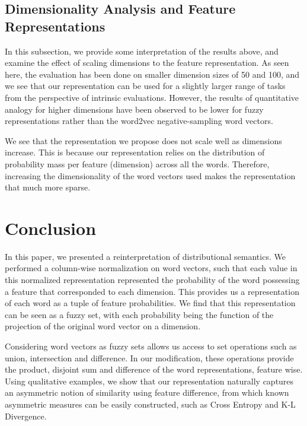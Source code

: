 \documentclass[11pt]{book}
\begin{document}
\subsection{Dimensionality Analysis and Feature Representations} \label{ssec:
analysis}

In this subsection, we provide some interpretation of the results above, and
examine the effect of scaling dimensions to the feature representation. As seen
here, the evaluation has been done on smaller dimension sizes of 50 and 100,
and we see that our representation can be used for a slightly larger range of
tasks from the perspective of intrinsic evaluations. However, the results of
quantitative analogy for higher dimensions have been observed to be lower for
fuzzy representations rather than the word2vec negative-sampling word vectors. 

We see that the representation we propose does not scale well as dimensions
increase. This is because our representation relies on the distribution of
probability mass per feature (dimension) across all the words. Therefore,
increasing the dimensionality of the word vectors used makes the representation
that much more sparse.

\section{Conclusion} \label{sec: conclusion}

In this paper, we presented a reinterpretation of distributional semantics. We
performed a column-wise normalization on word vectors, such that each value in
this normalized representation represented the probability of the word
possessing a feature that corresponded to each dimension. This provides us a
representation of each word as a tuple of feature probabilities. We find that
this representation can be seen as a fuzzy set, with each probability being the
function of the projection of the original word vector on a dimension.

Considering word vectors as fuzzy sets allows us access to set operations such
as union, intersection and difference. In our modification, these operations
provide the product, disjoint sum and difference of the word representations,
feature wise. Using qualitative examples, we show that our representation
naturally captures an asymmetric notion of similarity using feature difference,
from which known asymmetric measures can be easily constructed, such as Cross
Entropy and K-L Divergence.
\end{document}

